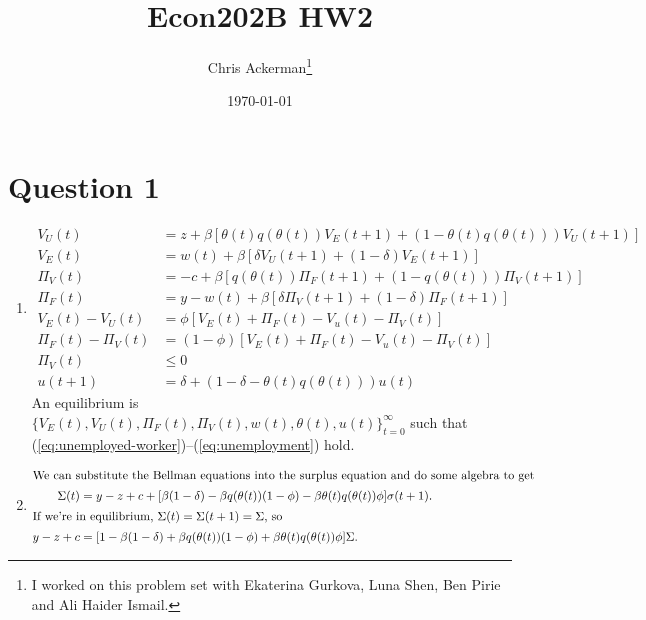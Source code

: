 \documentclass[11pt]{article}
\author{Chris Ackerman\thanks{I worked on this problem set with Ekaterina Gurkova, Luna Shen, Ben Pirie and Ali Haider Ismail.}}
\date{\today}
\title{Econ202B HW2}
\begin{document}
\maketitle
\tableofcontents

\newpage

\section{Question 1}
\label{sec:org987eb42}

\begin{enumerate}
\item
\begin{align}
V_U(t) &= z + \beta [\theta(t) q(\theta (t))V_E(t + 1) + (1 - \theta(t)q(\theta(t))) V_U(t + 1)]\tag{unemployed worker}\label{eq:unemployed-worker}\\
V_E(t) &= w(t) + \beta [\delta V_U (t + 1) + (1 - \delta) V_E(t + 1)]\tag{employed worker}\label{eq:employed-worker}\\
\Pi_V(t) &= -c + \beta [q(\theta(t))\Pi_F (t + 1) + (1 - q(\theta(t))) \Pi_V (t + 1)] \tag{empty vacancy}\label{eq:empty-vacancy}\\
\Pi_F(t) &= y - w(t) + \beta [\delta \Pi_V (t + 1) + (1 - \delta) \Pi_F (t + 1)]\tag{filled vacancy}\label{eq:filled-vacancy}\\
V_E(t) - V_U (t) &= \phi [V_E (t) + \Pi_F(t) - V_u (t) - \Pi_V (t)]\tag{worker surplus}\label{eq:worker-surplus}\\
\Pi_F(t) - \Pi_V (t) &= (1 - \phi) [V_E (t) + \Pi_F(t) - V_u (t) - \Pi_V (t)]\tag{firm surplus}\label{eq:firm-surplus}\\ 
\Pi_V (t) &\le 0 \tag{free entry} \label{eq:free-entry}\\
u(t + 1) &= \delta + (1 - \delta - \theta (t) q(\theta (t))) u(t) \tag{unemployment law of motion} \label{eq:unemployment}
\end{align}
An equilibrium is $\{ V_E(t), V_U(t), \Pi_F(t), \Pi_V(t), w(t), \theta(t), u(t)\}_{t = 0}^\infty$ such that (\ref{eq:unemployed-worker})--(\ref{eq:unemployment}) hold.
\item
\begin{align}
\intertext{We can substitute the Bellman equations into the surplus equation and do some algebra to get}
\Sigma(t) &= y - z + c + [\beta (1 - \delta) - \beta q(\theta(t)) (1 - \phi) - \beta \theta (t) q(\theta(t)) \phi] \sigma (t + 1).\\
\intertext{If we're in equilibrium, $\Sigma (t) = \Sigma (t+ 1) = \Sigma$, so}
y - z + c &= [1 - \beta (1 - \delta) + \beta q(\theta(t)) (1 - \phi) + \beta \theta (t) q(\theta (t)) \phi] \Sigma.\\

\end{align}
\end{enumerate}
\end{document}

